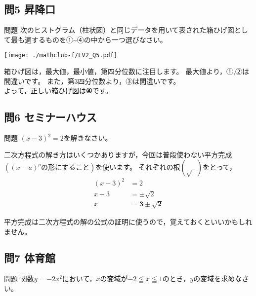 \documentclass[a5paper]{ltjsarticle}
\begin{document}
\subsection*{問5 昇降口}
\begin{itembox}[l]{問題}
  次のヒストグラム（柱状図）と同じデータを用いて表された箱ひげ図として最も適するものを①\textasciitilde ④の中から一つ選びなさい。%
  \begin{center}
    \texttt{[image: ./mathclub-f/LV2\_Q5.pdf]}
  \end{center}
\end{itembox}

箱ひげ図は，最大値，最小値，第\bigcirc 四分位数に注目します。%
最大値より，①,②は間違いです。
また，第3四分位数より，③は間違いです。\\
よって，正しい箱ひげ図は{\bfseries ④}です。


\subsection*{問6 セミナーハウス}
\begin{itembox}[l]{問題}
  ${(x-3)}^2=2$を解きなさい。
\end{itembox}

二次方程式の解き方はいくつかありますが，今回は普段使わない平方完成$\left({(x-a)}^p\text{の形にすること}\right)$を使います。
それぞれの根$(\sqrt{\:\:})$をとって，
\begin{align*}
  {(x-3)}^2&=2\\
  x-3&=\pm \sqrt{2}\\
  x&=\bm{3\pm \sqrt{2}}
\end{align*}

平方完成は二次方程式の解の公式の証明に使うので，覚えておくといいかもしれません。


\subsection*{問7 体育館}
\begin{itembox}[l]{問題}
  関数$y=-2x^2$において，$x$の変域が$-2 \leqq x \leqq 1$のとき，$y$の変域を求めなさい。
\end{itembox}
\end{document}
